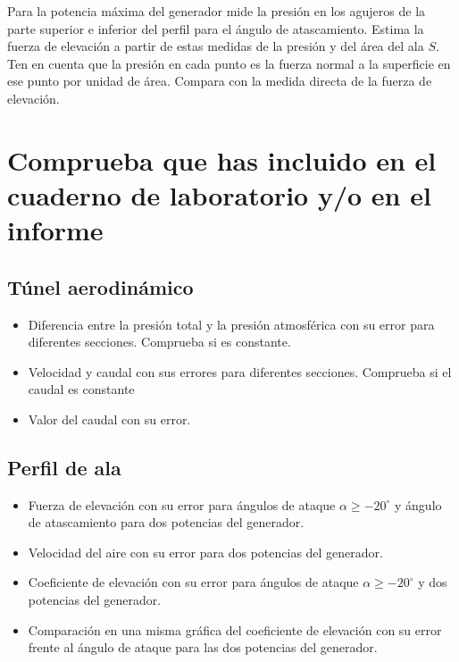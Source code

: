 \documentclass[11pt]{articulo}
\begin{document}
Para la potencia m\'axima del generador mide la presi\'on en los agujeros de la parte superior e inferior del perfil para el \'angulo de atascamiento. Estima la fuerza de elevaci\'on a partir de estas medidas de la presi\'on y del \'area del ala $S$. Ten en cuenta que la presi\'on en cada punto es la fuerza normal a la superficie en ese punto por unidad de \'area. Compara con la medida directa de la fuerza de elevaci\'on.

\newpage
\section{Comprueba que has incluido en el cuaderno de laboratorio y/o en el informe}

\subsection*{T\'unel aerodin\'amico}

\begin{itemize}

\item{Diferencia entre la presi\'on total y la presi\'on atmosf\'erica con su error para diferentes secciones. Comprueba si es constante.}
\item{Velocidad y caudal con sus errores para diferentes secciones. Comprueba si el caudal es constante}
\item{Valor del caudal con su error.}

\end{itemize}

\subsection*{Perfil de ala}

\begin{itemize}

\item{Fuerza de elevaci\'on con su error para \'angulos de ataque $\alpha \geq -20^{\circ}$ y \'angulo de atascamiento para dos potencias del generador.}
\item{Velocidad del aire con su error para dos potencias del generador.}
\item{Coeficiente de elevaci\'on con su error para \'angulos de ataque $\alpha \geq -20^{\circ}$ y dos potencias del generador.}
\item{Comparaci\'on en una misma gr\'afica del coeficiente de elevaci\'on con su error frente al \'angulo de ataque para las dos potencias del generador.}

\end{itemize}
\end{document}
